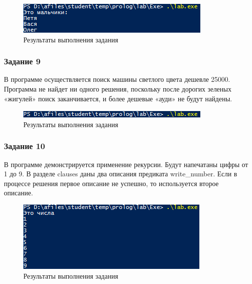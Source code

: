 \documentclass[14pt,a4paper,report]{report}
\begin{document}




\begin{figure}[h!]
	\centering
	\includegraphics[scale = 1.0]{images/d8.png}
	\caption{Результаты выполнения задания}
\end{figure}

\subsubsection{Задание 9}

В программе осуществляется поиск машины светлого цвета дешевле 25000. Программа не найдет ни одного решения, поскольку после дорогих зеленых «жигулей» поиск заканчивается, и более дешевые «ауди» не будут найдены.



\begin{figure}[h!]
	\centering
	\includegraphics[scale = 1.0]{images/d9.png}
	\caption{Результаты выполнения задания}
\end{figure}

\subsubsection{Задание 10}

В программе демонстрируется применение рекурсии. Будут напечатаны цифры от 1 до 9. В разделе clauses даны два описания предиката write\_number. Если в процессе решения первое описание не успешно, то используется второе описание.



\begin{figure}[h!]
	\centering
	\includegraphics[scale = 1.0]{images/d10.png}
	\caption{Результаты выполнения задания}
\end{figure}
\end{document}
